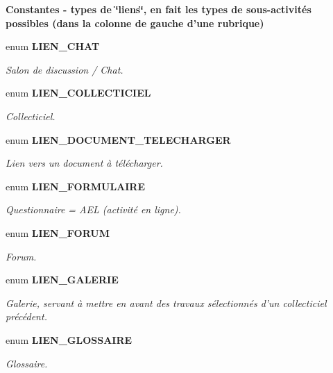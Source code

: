 \begin{Indent}{\bf Constantes - types de \char`\"{}liens\char`\"{}, en fait les types de sous-activités possibles (dans la colonne de gauche d'une rubrique)}\par
\begin{CompactItemize}
\item 
enum {\bf LIEN\_\-CHAT} 
\begin{CompactList}\small\item\em Salon de discussion / Chat. \item\end{CompactList}\item 
enum {\bf LIEN\_\-COLLECTICIEL} 
\begin{CompactList}\small\item\em Collecticiel. \item\end{CompactList}\item 
enum {\bf LIEN\_\-DOCUMENT\_\-TELECHARGER} 
\begin{CompactList}\small\item\em Lien vers un document à télécharger. \item\end{CompactList}\item 
enum {\bf LIEN\_\-FORMULAIRE} 
\begin{CompactList}\small\item\em Questionnaire = AEL (activité en ligne). \item\end{CompactList}\item 
enum {\bf LIEN\_\-FORUM} 
\begin{CompactList}\small\item\em Forum. \item\end{CompactList}\item 
enum {\bf LIEN\_\-GALERIE} 
\begin{CompactList}\small\item\em Galerie, servant à mettre en avant des travaux sélectionnés d'un collecticiel précédent. \item\end{CompactList}\item 
enum {\bf LIEN\_\-GLOSSAIRE} 
\begin{CompactList}\small\item\em Glossaire. \item\end{CompactList}\item 

\end{CompactItemize}
\end{Indent}
